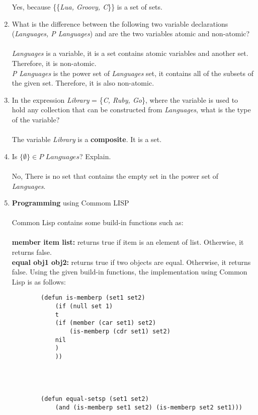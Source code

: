 \begin{enumerate}
    Yes, because \{\{\textit{Lua, Groovy, C}\}\} is a set of sets.
    \item What is the difference between the following two variable declarations (\textit{Languages, P Languages}) and are the two variables atomic and non-atomic? \\ \\
    \textit{Languages} is a variable, it is a set contains atomic variables and another set. Therefore, it is non-atomic.\\
    \textit{P Languages} is the power set of \textit{Languages} set, it contains all of the subsets of the given set. Therefore, it is also non-atomic. 
    \item In the expression \textit{Library} = \{\textit{C, Ruby, Go}\}, where the variable is used to hold any collection that can be constructed from \textit{Languages}, what is the type of the variable?\\ \\
    The variable \textit{Library} is a \textbf{composite}. It is a set.
    \item Is $\{\emptyset\} \in \textit{P Languages}$? Explain.\\ \\ 
    No, There is no set that contains the empty set in the power set of \textit{Languages}.
    \item \textbf{Programming} using Commom LISP\\ \\
    Common Lisp contains some build-in functions such as: \\\\
    \textbf{member item list: } returns true if item is an element of list. Otherwise, it returns false.\\
    \textbf{equal obj1 obj2: } returns true if two objects are equal. Otherwise, it returns false.
    Using the given build-in functions, the implementation using Common Lisp is as follows: 
    \begin{lstlisting}
        (defun is-memberp (set1 set2)
            (if (null set 1)
            t
            (if (member (car set1) set2)
                (is-memberp (cdr set1) set2)
            nil
            )
            ))
    \end{lstlisting}\\ \\
    \begin{lstlisting}
        (defun equal-setsp (set1 set2)
            (and (is-memberp set1 set2) (is-memberp set2 set1)))

\end{lstlisting}
\end{enumerate}
